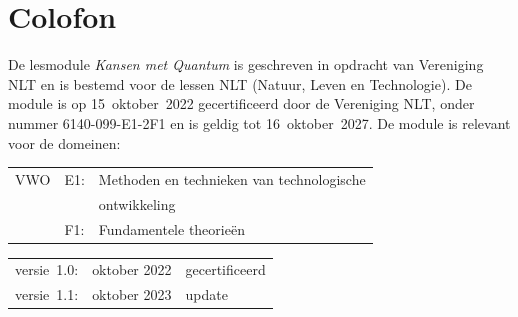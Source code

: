 \documentclass[../../main.tex]{subfiles}
\begin{document}
\section*{Colofon}

De lesmodule \textit{Kansen met Quantum} is geschreven in opdracht van Vereniging NLT en is bestemd voor de lessen NLT (Natuur, Leven en Technologie). De module is op 15~oktober~2022  gecertificeerd door de Vereniging NLT, onder nummer 6140-099-E1-2F1 en is geldig tot 16~oktober~2027. De module is relevant voor de domeinen:
 

\begin{tabular}{lll}
VWO & E1:& Methoden en technieken van technologische\\
    &    & ontwikkeling \\ 
    & F1:& Fundamentele theorie\"en \\ 
\end{tabular} 

\begin{tabular}{lll}
versie~1.0: & oktober 2022 & gecertificeerd\\
versie~1.1: & oktober 2023 & update\\
\end{tabular} 
\end{document}
